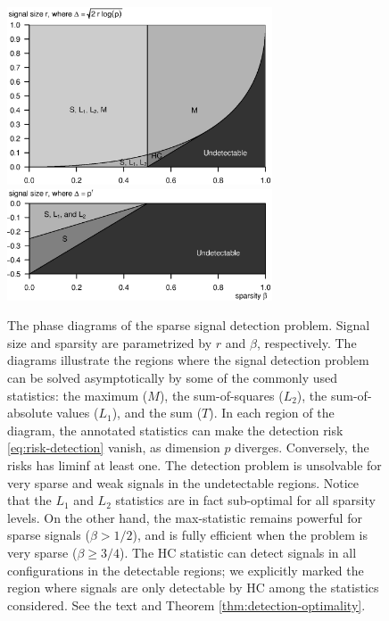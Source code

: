 \begin{figure}
      \centering
      \includegraphics[width=0.7\textwidth]{figures/phase_diagram_signal_detection.eps}
      \includegraphics[width=0.7\textwidth]{figures/phase_diagram_signal_detection_vanishing_signals.eps}
      \caption{The phase diagrams of the sparse signal detection problem. 
      Signal size and sparsity are parametrized by $r$ and $\beta$, respectively.
      The diagrams illustrate the regions where the signal detection problem can be solved asymptotically by some of the commonly used statistics: the maximum ($M$), the sum-of-squares ($L_2$), the sum-of-absolute values ($L_1$), and the sum ($T$).
      In each region of the diagram, the annotated statistics can make the detection risk \eqref{eq:risk-detection} vanish, as dimension $p$ diverges. Conversely, the risks has liminf at least one.
      The detection problem is unsolvable for very sparse and weak signals in the undetectable regions.
      Notice that the $L_1$ and $L_2$ statistics are in fact sub-optimal for all sparsity levels.
      On the other hand, the max-statistic remains powerful for sparse signals ($\beta>1/2$), and is fully efficient when the problem is very sparse ($\beta\ge3/4$).
      The \ac{HC} statistic can detect signals in all configurations in the detectable regions; we explicitly marked the region where signals are only detectable by \ac{HC} among the statistics considered.
      See the text and Theorem \ref{thm:detection-optimality}.}
      \label{fig:phase-diagram-signal-detection}
\end{figure}


